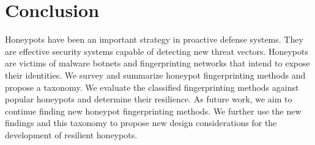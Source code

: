 \section{Conclusion}
\label{sec:conc}

Honeypots have been an important strategy in proactive defense systems. They are effective security systems capable of detecting new threat vectors. Honeypots are victims of malware botnets and fingerprinting networks that intend to expose their identities.  We survey and summarize honeypot fingerprinting methods and propose a taxonomy. We evaluate the classified fingerprinting methods against popular honeypots and determine their resilience. As future work, we aim to continue finding new honeypot fingerprinting methods. We further use the new findings and this taxonomy to propose new design considerations for the development of resilient honeypots. 